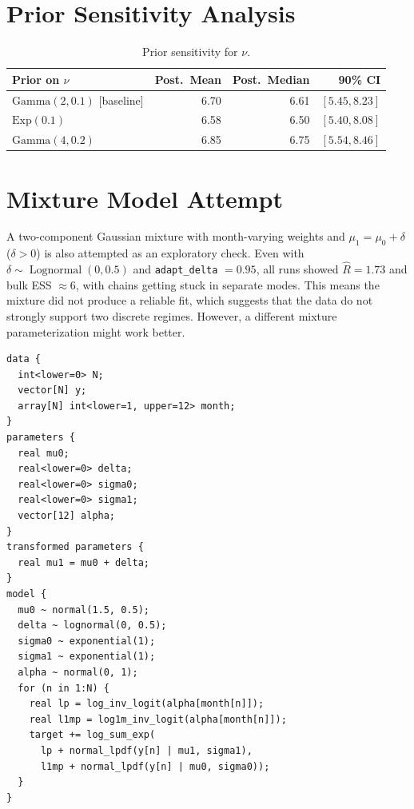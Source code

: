\documentclass[10pt]{article}
\begin{document}
\section{Prior Sensitivity Analysis}\label{app:sensitivity}

\begin{table}[H]
\centering\small
\caption{Prior sensitivity for $\nu$.}\label{tab:sensitivity}
\begin{tabular}{lrrr}
\toprule
Prior on $\nu$ & Post.\ Mean & Post.\ Median & 90\% CI \\
\midrule
$\text{Gamma}(2, 0.1)$ [baseline] & 6.70 & 6.61 & $[5.45, 8.23]$ \\
$\text{Exp}(0.1)$                  & 6.58 & 6.50 & $[5.40, 8.08]$ \\
$\text{Gamma}(4, 0.2)$            & 6.85 & 6.75 & $[5.54, 8.46]$ \\
\bottomrule
\end{tabular}
\end{table}


\section{Mixture Model Attempt}\label{app:mixture}

A two-component Gaussian mixture with month-varying weights and $\mu_1 = \mu_0 + \delta$ ($\delta > 0$) is also attempted as an exploratory check. Even with $\delta \sim \operatorname{Lognormal}(0, 0.5)$ and \texttt{adapt\_delta} $= 0.95$, all runs showed $\hat{R} = 1.73$ and bulk ESS $\approx 6$, with chains getting stuck in separate modes. This means the mixture did not produce a reliable fit, which suggests that the data do not strongly support two discrete regimes. However, a different mixture parameterization might work better.

\begin{verbatim}
data {
  int<lower=0> N;
  vector[N] y;
  array[N] int<lower=1, upper=12> month;
}
parameters {
  real mu0;
  real<lower=0> delta;
  real<lower=0> sigma0;
  real<lower=0> sigma1;
  vector[12] alpha;
}
transformed parameters {
  real mu1 = mu0 + delta;
}
model {
  mu0 ~ normal(1.5, 0.5);
  delta ~ lognormal(0, 0.5);
  sigma0 ~ exponential(1);
  sigma1 ~ exponential(1);
  alpha ~ normal(0, 1);
  for (n in 1:N) {
    real lp = log_inv_logit(alpha[month[n]]);
    real l1mp = log1m_inv_logit(alpha[month[n]]);
    target += log_sum_exp(
      lp + normal_lpdf(y[n] | mu1, sigma1),
      l1mp + normal_lpdf(y[n] | mu0, sigma0));
  }
}
\end{verbatim}
\end{document}
